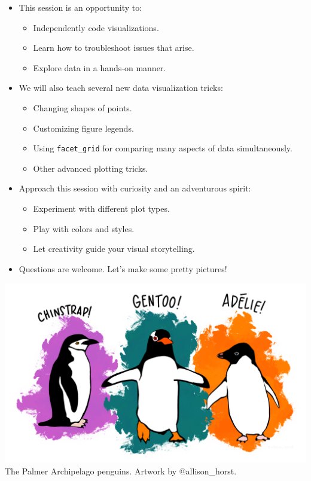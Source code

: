 \documentclass[
  letterpaper,
  DIV=11,
  numbers=noendperiod]{scrreprt}
\providecommand{\tightlist}{%
  \setlength{\itemsep}{0pt}\setlength{\parskip}{0pt}}\usepackage{longtable,booktabs,array}
\begin{document}
\begin{itemize}
\tightlist
\item
  This session is an opportunity to:

  \begin{itemize}
  \tightlist
  \item
    Independently code visualizations.
  \item
    Learn how to troubleshoot issues that arise.
  \item
    Explore data in a hands-on manner.
  \end{itemize}
\item
  We will also teach several new data visualization tricks:

  \begin{itemize}
  \tightlist
  \item
    Changing shapes of points.
  \item
    Customizing figure legends.
  \item
    Using \texttt{facet\_grid} for comparing many aspects of data
    simultaneously.
  \item
    Other advanced plotting tricks.
  \end{itemize}
\item
  Approach this session with curiosity and an adventurous spirit:

  \begin{itemize}
  \tightlist
  \item
    Experiment with different plot types.
  \item
    Play with colors and styles.
  \item
    Let creativity guide your visual storytelling.
  \end{itemize}
\item
  Questions are welcome. Let's make some pretty pictures!
\end{itemize}

\includegraphics{scripts/02_dataViz/DataVizDay2-files/lter_penguins.png}
The Palmer Archipelago penguins. Artwork by @allison\_horst.
\end{document}
